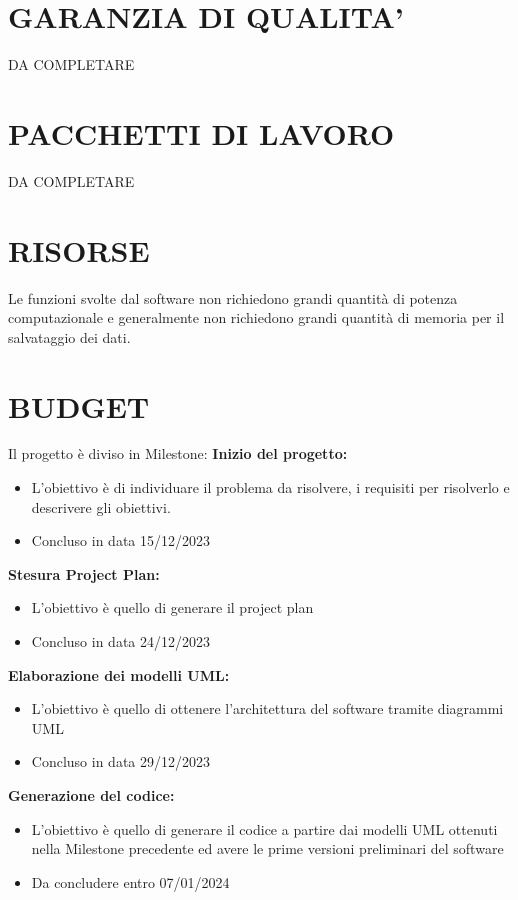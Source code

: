 \documentclass{report}
\begin{document}
\chapter{GARANZIA DI QUALITA'}
DA COMPLETARE
\chapter{PACCHETTI DI LAVORO}
DA COMPLETARE
\chapter{RISORSE}
Le funzioni svolte dal software non richiedono grandi quantità di potenza computazionale e generalmente non richiedono grandi quantità di memoria per il salvataggio dei dati.\\

\begingroup
\let\clearpage\relax
\chapter{BUDGET}
\endgroup

Il progetto è diviso in Milestone:
\textbf{Inizio del progetto:} 
\begin{itemize}
\item L'obiettivo è di individuare il problema da risolvere, i requisiti per risolverlo e descrivere gli obiettivi.
\item Concluso in data 15/12/2023
\end{itemize}

\textbf{Stesura Project Plan:}
\begin{itemize}
\item L'obiettivo è quello di generare il project plan
\item Concluso in data 24/12/2023
\end{itemize}

\textbf{Elaborazione dei modelli UML:}
\begin{itemize}
\item L'obiettivo è quello di ottenere l'architettura del software tramite diagrammi UML
\item Concluso in data 29/12/2023
\end{itemize}

\textbf{Generazione del codice:}
\begin{itemize}
\item L'obiettivo è quello di generare il codice a partire dai modelli UML ottenuti nella Milestone precedente ed avere le prime versioni preliminari del software
\item Da concludere entro 07/01/2024
\end{itemize}
\end{document}
